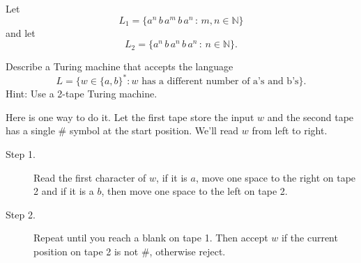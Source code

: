 \documentclass[12pt]{exam}
\newcommand{\N}{\mathbb{N}}
\begin{document}
\begin{questions}
\newpage

\question Let 
$$L_1 = \{a^n \, b \, a^m \, b \, a^n \, : \, m, n \in \N\}$$
and let 
$$L_2 = \{a^n \, b \, a^n \, b \, a^n \,:\, n \in \N \}.$$

\question Describe a Turing machine that accepts the language 
$$L = \{w \in \{a, b\}^* : w \text{ has a different number of a's and b's} \}.$$
Hint: Use a 2-tape Turing machine.
\begin{solution}
Here is one way to do it. Let the first tape store the input $w$ and the second tape has a single $\#$ symbol at the start position. We'll read $w$ from left to right.
\begin{description}
\item[Step 1.] Read the first character of $w$, if it is $a$, move one space to the right on tape 2 and if it is a $b$, then move one space to the left on tape 2. 
\item[Step 2.] Repeat until you reach a blank on tape 1.  Then accept $w$ if the current position on tape 2 is not $\#$, otherwise reject. 
\end{description}
\end{solution}
\vfill

\end{questions}
\end{document}
